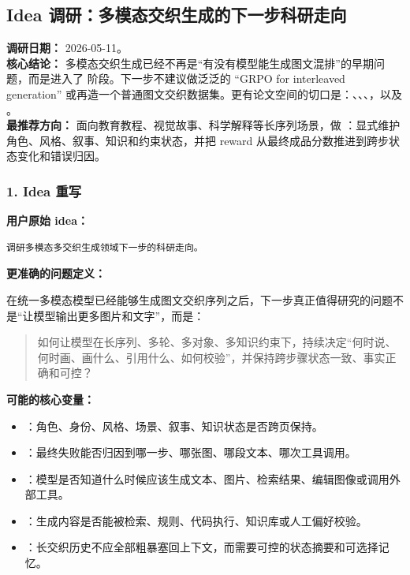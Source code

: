 \subsection*{Idea 调研：多模态交织生成的下一步科研走向}
{}

\begin{conceptbox}
\textbf{调研日期：} 2026-05-11。\\
\textbf{核心结论：} 多模态交织生成已经不再是“有没有模型能生成图文混排”的早期问题，而是进入了  阶段。下一步不建议做泛泛的 ``GRPO for interleaved generation'' 或再造一个普通图文交织数据集。更有论文空间的切口是：、、、，以及 。\\
\textbf{最推荐方向：} 面向教育教程、视觉故事、科学解释等长序列场景，做 ：显式维护角色、风格、叙事、知识和约束状态，并把 reward 从最终成品分数推进到跨步状态变化和错误归因。
\end{conceptbox}

\subsubsection*{1. Idea 重写}

\textbf{用户原始 idea：}

\begin{lstlisting}[language={},basicstyle=\ttfamily\small]
调研多模态多交织生成领域下一步的科研走向。
\end{lstlisting}

\textbf{更准确的问题定义：}

在统一多模态模型已经能够生成图文交织序列之后，下一步真正值得研究的问题不是“让模型输出更多图片和文字”，而是：

\begin{quote}
如何让模型在长序列、多轮、多对象、多知识约束下，持续决定“何时说、何时画、画什么、引用什么、如何校验”，并保持跨步骤状态一致、事实正确和可控？
\end{quote}

\textbf{可能的核心变量：}

\begin{itemize}[leftmargin=1.5em]
  \item {}：角色、身份、风格、场景、叙事、知识状态是否跨页保持。
  \item {}：最终失败能否归因到哪一步、哪张图、哪段文本、哪次工具调用。
  \item {}：模型是否知道什么时候应该生成文本、图片、检索结果、编辑图像或调用外部工具。
  \item {}：生成内容是否能被检索、规则、代码执行、知识库或人工偏好校验。
  \item {}：长交织历史不应全部粗暴塞回上下文，而需要可控的状态摘要和可选择记忆。
\end{itemize}


